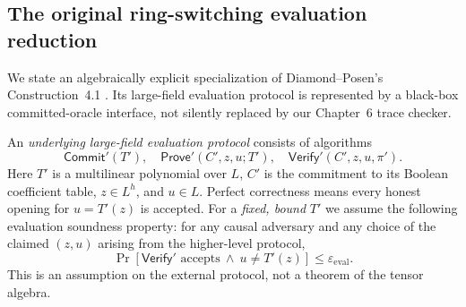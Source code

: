 \subsection{The original ring-switching evaluation reduction}\label{sec:dpr:protocol}

We state an algebraically explicit specialization of
Diamond--Posen's Construction~4.1
\cite{DiamondPosen2024}. Its large-field
evaluation protocol is represented by a black-box
committed-oracle interface, not silently replaced
by our Chapter~6 trace checker.

\begin{definition}\label{def:dpr:large-pcs}
An \emph{underlying large-field evaluation protocol}
consists of algorithms
\[
 \mathsf{Commit}'(T'),\quad
 \mathsf{Prove}'(C',z,u;T'),\quad
 \mathsf{Verify}'(C',z,u,\pi').
\]
Here $T'$ is a multilinear polynomial over $L$,
$C'$ is the commitment to its Boolean coefficient
table, $z\in L^h$, and $u\in L$.
Perfect correctness means every honest opening
for $u=T'(z)$ is accepted. For a \emph{fixed,
bound} $T'$ we assume the following
evaluation soundness property: for any causal
adversary and any choice of the claimed
$(z,u)$ arising from the higher-level protocol,
\[
 \Pr[\mathsf{Verify}'\text{ accepts}\ \land\
 u\neq T'(z)]\leq\varepsilon_{\mathrm{eval}}.
\]
This is an assumption on the external protocol,
not a theorem of the tensor algebra.
\end{definition}

